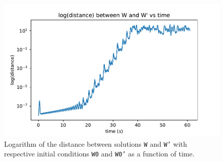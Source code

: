 \documentclass[a4paper,11pt]{article}
\theoremstyle{plain}
\theoremstyle{definition}
\theoremstyle{remark}
\begin{document}
\begin{figure}[H]
    \centering
    \includegraphics[width=\linewidth]{../plots/a3q2_dist_vs_t.pdf}
    \caption{Logarithm of the distance between solutions \texttt{W} and
    \texttt{W'} with respective initial conditions \texttt{W0} 
    and \texttt{W0'} as a function of time.}
    \label{q2:3}
\end{figure}
\end{document}
